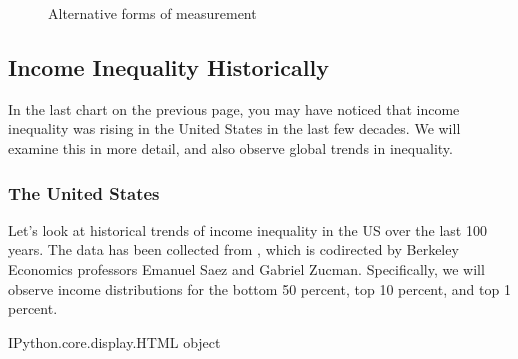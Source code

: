\documentclass[letterpaper,10pt,english]{jupyterBook}
\begin{document}
\begin{figure}[htbp]
\centering
\capstart

\noindent{}
\caption{Alternative forms of measurement}\label{\detokenize{content/06-inequality/inequality:id1}}\end{figure}


\subsection{Income Inequality Historically}
\label{\detokenize{content/06-inequality/historical-inequality:income-inequality-historically}}\label{\detokenize{content/06-inequality/historical-inequality::doc}}


\sphinxAtStartPar
In the last chart on the previous page, you may have noticed that income inequality was rising in the United States in the last few decades. We will examine this in more detail, and also observe global trends in inequality.


\subsubsection{The United States}
\label{\detokenize{content/06-inequality/historical-inequality:the-united-states}}
\sphinxAtStartPar
Let’s look at historical trends of income inequality in the US over the last 100 years. The data has been collected from , which is co\sphinxhyphen{}directed by Berkeley Economics professors Emanuel Saez and Gabriel Zucman. Specifically, we will observe income distributions for the bottom 50 percent, top 10 percent, and top 1 percent.

\begin{sphinxVerbatim}[commandchars=\\\{\}]
  
\end{sphinxVerbatim}

\begin{sphinxVerbatim}[commandchars=\\\{\}]
\PYGZlt{}IPython.core.display.HTML object\PYGZgt{}
\end{sphinxVerbatim}

\begin{sphinxVerbatim}[commandchars=\\\{\}]
\end{sphinxVerbatim}
\end{document}
